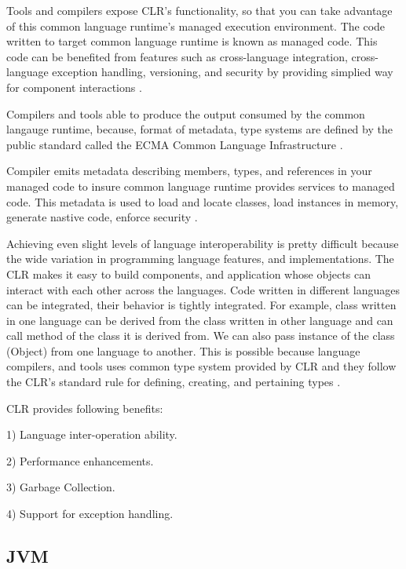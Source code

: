 Tools and compilers expose CLR's functionality, so that you can take advantage of this common language runtime's managed execution environment. The code written to target common language runtime is known as managed code. This code can be benefited from features such as cross-language integration, cross-language exception handling, versioning, and security by providing simplied way for component interactions \cite{commonlanguageruntime}.


Compilers and tools able to produce the output consumed by the common langauge runtime, because, format of metadata, type systems are defined by the public standard called the ECMA Common Language Infrastructure \cite{Gough:2001:CNC:559569}.

Compiler emits metadata describing members, types, and references in your managed code to insure common language runtime provides services to managed code. This metadata is used to load and locate classes, load instances in memory, generate nastive code, enforce security \cite{Gough:2001:CNC:559569}.

Achieving even slight levels of language interoperability is pretty difficult because the wide variation in programming language features, and implementations. The CLR makes it easy to build components, and application whose objects can interact with each other across the languages. Code written in different languages can be integrated, their behavior is tightly integrated. For example, class written in one language can be derived from the class written in other language and can call method of the class it is derived from. We can also pass instance of the class (Object) from one language to another. This is possible because language compilers, and tools uses common type system provided by CLR and they follow the CLR’s standard rule for defining, creating, and pertaining types \cite{Kennedy:2001:DIG:381694.378797}.


CLR provides following benefits: 

1) Language inter-operation ability.

2) Performance enhancements.

3) Garbage Collection.

4) Support for exception handling.



\subsection{JVM}

